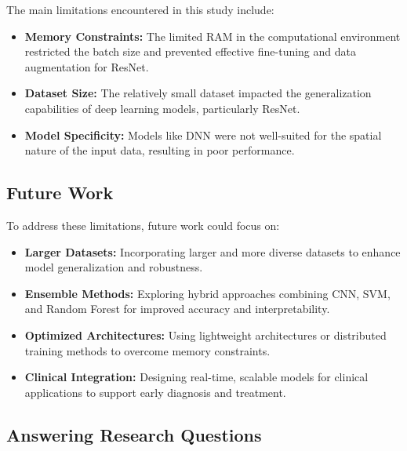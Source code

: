 \documentclass[runningheads]{llncs}
\begin{document}
The main limitations encountered in this study include:

\begin{itemize}
    \item \textbf{Memory Constraints:} The limited RAM in the computational environment restricted the batch size and prevented effective fine-tuning and data augmentation for ResNet.
    \item \textbf{Dataset Size:} The relatively small dataset impacted the generalization capabilities of deep learning models, particularly ResNet.
    \item \textbf{Model Specificity:} Models like DNN were not well-suited for the spatial nature of the input data, resulting in poor performance.
\end{itemize}

\subsection{Future Work}

To address these limitations, future work could focus on:
\begin{itemize}
    \item \textbf{Larger Datasets:} Incorporating larger and more diverse datasets to enhance model generalization and robustness.
    \item \textbf{Ensemble Methods:} Exploring hybrid approaches combining CNN, SVM, and Random Forest for improved accuracy and interpretability.
    \item \textbf{Optimized Architectures:} Using lightweight architectures or distributed training methods to overcome memory constraints.
    \item \textbf{Clinical Integration:} Designing real-time, scalable models for clinical applications to support early diagnosis and treatment.
\end{itemize}

\subsection{Answering Research Questions}
\end{document}
